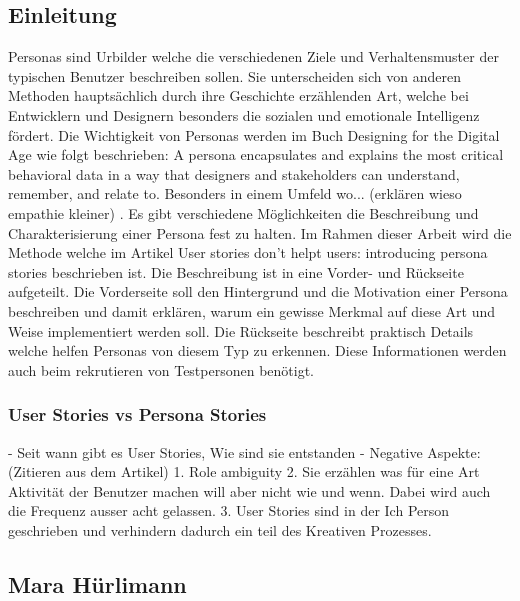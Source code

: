 \subsection{Einleitung}
Personas sind Urbilder welche die verschiedenen Ziele und Verhaltensmuster der typischen Benutzer beschreiben sollen. Sie unterscheiden sich von anderen Methoden hauptsächlich durch ihre Geschichte erzählenden Art, welche bei Entwicklern und Designern besonders die sozialen und emotionale Intelligenz fördert. Die Wichtigkeit von Personas werden im Buch Designing for the Digital Age \citep[chapter 11]{goodwin2011designing} wie folgt beschrieben: \glqq A persona encapsulates and explains the most critical behavioral data in a way that designers and stakeholders can understand, remember, and relate to\grqq. Besonders in einem Umfeld wo... (erklären wieso empathie kleiner) \citep{hudson2009empathy}.
\newline{}
Es gibt verschiedene Möglichkeiten die Beschreibung und Charakterisierung einer Persona fest zu halten. Im Rahmen dieser Arbeit wird die Methode welche im Artikel \citep{interactions.acm2013online} \glqq User stories don't helpt users: introducing persona stories \grqq beschrieben ist. Die Beschreibung ist in eine Vorder- und Rückseite aufgeteilt. Die Vorderseite soll den Hintergrund und die Motivation einer Persona beschreiben und damit erklären, warum ein gewisse Merkmal auf diese Art und Weise implementiert werden soll. Die Rückseite beschreibt praktisch Details welche helfen Personas von diesem Typ zu erkennen. Diese Informationen werden auch beim rekrutieren von Testpersonen benötigt.

\subsubsection{User Stories vs Persona Stories}
- Seit wann gibt es User Stories, Wie sind sie entstanden
\newline{}
- Negative Aspekte: (Zitieren aus dem Artikel)
	1. Role ambiguity
	2. Sie erzählen was für eine Art Aktivität der Benutzer machen will aber nicht wie und wenn. Dabei wird auch die Frequenz ausser acht gelassen.
	3. User Stories sind in der Ich Person geschrieben und verhindern dadurch ein teil des Kreativen Prozesses.

\subsection{Mara Hürlimann}

